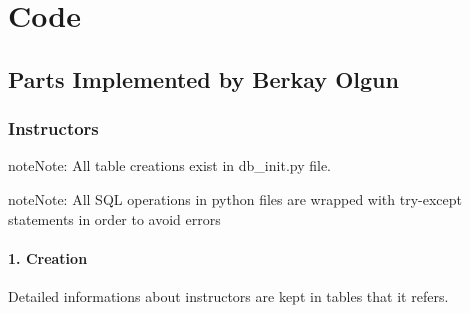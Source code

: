 \documentclass[letterpaper,10pt,english]{sphinxmanual}
\begin{document}
\section{Code}
\label{\detokenize{developer/index:code}}

\subsection{Parts Implemented by Berkay Olgun}
\label{\detokenize{developer/berkay:parts-implemented-by-berkay-olgun}}\label{\detokenize{developer/berkay::doc}}

\subsubsection{Instructors}
\label{\detokenize{developer/berkay:instructors}}
\begin{sphinxadmonition}{note}{Note:}
All table creations exist in db\_init.py file.
\end{sphinxadmonition}

\begin{sphinxadmonition}{note}{Note:}
All SQL operations in python files are wrapped with try-except statements in order to avoid errors
\end{sphinxadmonition}


\paragraph{1. Creation}
\label{\detokenize{developer/berkay:creation}}
Detailed informations about instructors are kept in tables that it refers.
\end{document}
